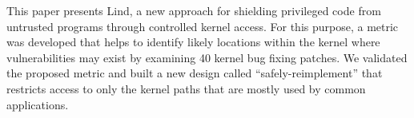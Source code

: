 


This paper presents Lind, a new approach for shielding privileged code from untrusted programs through controlled kernel access. 
For this purpose, a metric was developed that helps to identify likely locations within the kernel where vulnerabilities may exist 
by examining 40 kernel bug fixing patches. We validated the proposed metric and built a new design %
called ``safely-reimplement'' that restricts access to only the
kernel paths that are mostly used by common applications. 


